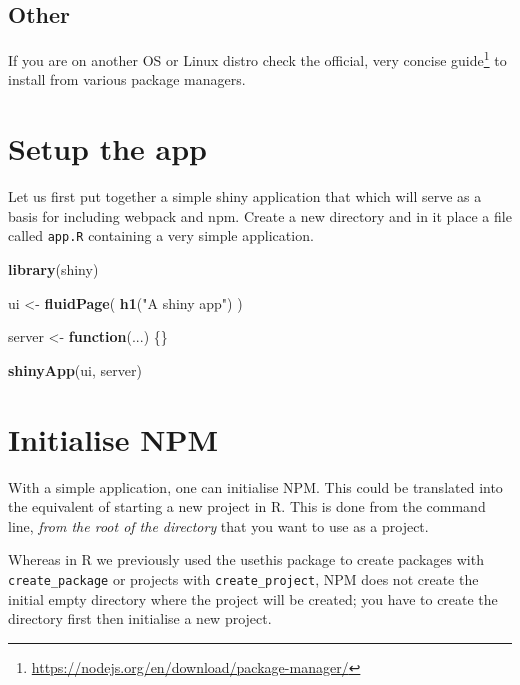 \documentclass[
  10pt,
]{krantz}
\makeatletter
\newenvironment{Shaded}{\begin{snugshade}}{\end{snugshade}}
\newcommand{\ControlFlowTok}[1]{\textcolor[rgb]{0.27,0.27,0.27}{\textbf{#1}}}
\newcommand{\KeywordTok}[1]{\textcolor[rgb]{0.27,0.27,0.27}{\textbf{#1}}}
\newcommand{\NormalTok}[1]{#1}
\newcommand{\StringTok}[1]{\textcolor[rgb]{0.5,0.5,0.5}{#1}}
\renewcommand{\href}[2]{#2\footnote{\url{#1}}}
\newenvironment{kframe}{%
\medskip{}
\setlength{\fboxsep}{.8em}
 \def\at@end@of@kframe{}%
 \ifinner\ifhmode%
  \def\at@end@of@kframe{\end{minipage}}%
  \begin{minipage}{\columnwidth}%
 \fi\fi%
 \def\FrameCommand##1{\hskip\@totalleftmargin \hskip-\fboxsep
 \colorbox{shadecolor}{##1}\hskip-\fboxsep
     \hskip-\linewidth \hskip-\@totalleftmargin \hskip\columnwidth}%
 \MakeFramed {\advance\hsize-\width
   \@totalleftmargin\z@ \linewidth\hsize
   \@setminipage}}%
 {\par\unskip\endMakeFramed%
 \at@end@of@kframe}
\renewenvironment{Shaded}{\begin{kframe}}{\end{kframe}}
\makeatother
\begin{document}
\hypertarget{webpack-intro-install-other}{%
\subsection{Other}\label{webpack-intro-install-other}}

If you are on another OS or Linux distro check the official, very concise \href{https://nodejs.org/en/download/package-manager/}{guide} to install from various package managers.

\hypertarget{webpack-intro-setup}{%
\section{Setup the app}\label{webpack-intro-setup}}

Let us first put together a simple shiny application that which will serve as a basis for including webpack and npm. Create a new directory and in it place a file called \texttt{app.R} containing a very simple application.

\begin{Shaded}
\begin{Highlighting}[]
\KeywordTok{library}\NormalTok{(shiny)}

\NormalTok{ui <{-}}\StringTok{ }\KeywordTok{fluidPage}\NormalTok{(}
  \KeywordTok{h1}\NormalTok{(}\StringTok{"A shiny app"}\NormalTok{)}
\NormalTok{)}

\NormalTok{server <{-}}\StringTok{ }\ControlFlowTok{function}\NormalTok{(...) \{\}}

\KeywordTok{shinyApp}\NormalTok{(ui, server)}
\end{Highlighting}
\end{Shaded}

\hypertarget{webpack-intro-init-npm}{%
\section{Initialise NPM}\label{webpack-intro-init-npm}}

With a simple application, one can initialise NPM. This could be translated into the equivalent of starting a new project in R. This is done from the command line, \emph{from the root of the directory} that you want to use as a project.

Whereas in R we previously used the usethis package to create packages with \texttt{create\_package} or projects with \texttt{create\_project}, NPM does not create the initial empty directory where the project will be created; you have to create the directory first then initialise a new project.
\end{document}
